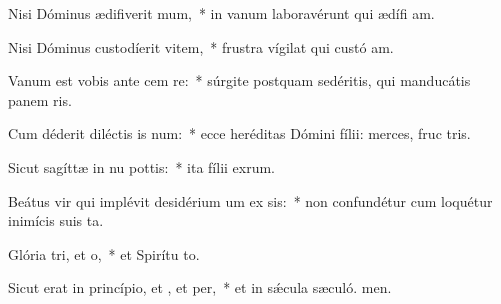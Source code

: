 \item Nisi Dóminus ædifiverit mum,~* in vanum laboravérunt qui ædífi am.
\item Nisi Dóminus custodíerit vitem,~* frustra vígilat qui custó am.
\item Vanum est vobis ante cem re:~* súrgite postquam sedéritis, qui manducátis panem ris.
\item Cum déderit diléctis is num:~* ecce heréditas Dómini fílii: merces, fruc tris.
\item Sicut sagíttæ in nu pottis:~* ita fílii exrum.
\item Beátus vir qui implévit desidérium um ex sis:~* non confundétur cum loquétur inimícis suis  ta.
\item Glória tri, et o,~* et Spirítu to.
\item Sicut erat in princípio, et , et per,~* et in sǽcula sæculó. men.
